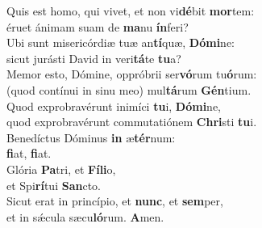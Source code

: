\oddverse Quis est homo, qui vivet, et non vi\textbf{dé}bit \textbf{mor}tem:~\*\\
\oddverse éruet ánimam suam de \textbf{ma}nu \textbf{ín}feri?\\
\evenverse Ubi sunt misericórdiæ tuæ an\textbf{tí}quæ, \textbf{Dó}\textbf{mi}ne:~\*\\
\evenverse sicut jurásti David in veri\textbf{tá}te \textbf{tu}a?\\
\oddverse Memor esto, Dómine, oppróbrii ser\textbf{vó}rum tu\textbf{ó}rum:~\*\\
\oddverse (quod contínui in sinu meo) mul\textbf{tá}rum \textbf{Gén}tium.\\
\evenverse Quod exprobravérunt inimíci \textbf{tu}i, \textbf{Dó}\textbf{mi}ne,~\*\\
\evenverse quod exprobravérunt commutatiónem \textbf{Chri}sti \textbf{tu}i.\\
\oddverse Benedíctus Dóminus \textbf{in} æ\textbf{tér}num:~\*\\
\oddverse \textbf{fi}at, \textbf{fi}at.\\
\evenverse Glória \textbf{Pa}tri, et \textbf{Fí}\textbf{li}o,~\*\\
\evenverse et Spi\textbf{rí}tui \textbf{San}cto.\\
\oddverse Sicut erat in princípio, et \textbf{nunc}, et \textbf{sem}per,~\*\\
\oddverse et in sǽcula sæcu\textbf{ló}rum. \textbf{A}men.\\
